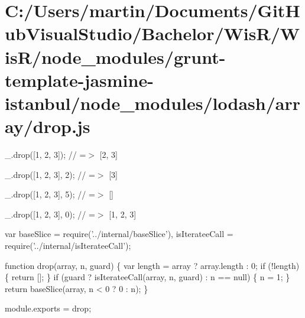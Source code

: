 \hypertarget{_c_1_2_users_2martin_2_documents_2_git_hub_visual_studio_2_bachelor_2_wis_r_2_wis_r_2node_modulea5c76f4e266006bfde185b789d4f64a9}{}\section{C\+:/\+Users/martin/\+Documents/\+Git\+Hub\+Visual\+Studio/\+Bachelor/\+Wis\+R/\+Wis\+R/node\+\_\+modules/grunt-\/template-\/jasmine-\/istanbul/node\+\_\+modules/lodash/array/drop.\+js}
\+\_\+.\+drop(\mbox{[}1, 2, 3\mbox{]}); // =$>$ \mbox{[}2, 3\mbox{]}

\+\_\+.\+drop(\mbox{[}1, 2, 3\mbox{]}, 2); // =$>$ \mbox{[}3\mbox{]}

\+\_\+.\+drop(\mbox{[}1, 2, 3\mbox{]}, 5); // =$>$ \mbox{[}\mbox{]}

\+\_\+.\+drop(\mbox{[}1, 2, 3\mbox{]}, 0); // =$>$ \mbox{[}1, 2, 3\mbox{]}


\begin{DoxyCodeInclude}
var baseSlice = require(\textcolor{stringliteral}{'../internal/baseSlice'}),
    isIterateeCall = require(\textcolor{stringliteral}{'../internal/isIterateeCall'});

\textcolor{keyword}{function} drop(array, n, guard) \{
  var length = array ? array.length : 0;
  \textcolor{keywordflow}{if} (!length) \{
    \textcolor{keywordflow}{return} [];
  \}
  \textcolor{keywordflow}{if} (guard ? isIterateeCall(array, n, guard) : n == null) \{
    n = 1;
  \}
  \textcolor{keywordflow}{return} baseSlice(array, n < 0 ? 0 : n);
\}

module.exports = drop;
\end{DoxyCodeInclude}
 